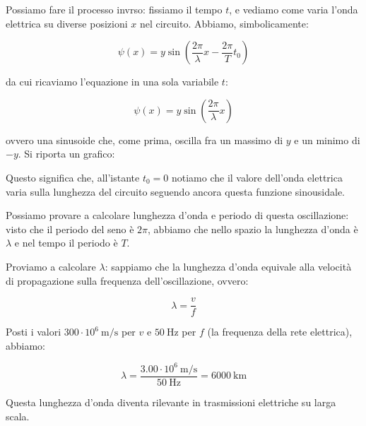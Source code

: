 \documentclass[a4paper,11pt]{article}
\begin{document}
Possiamo fare il processo invrso: fissiamo il tempo $t$, e vediamo come varia l'onda elettrica su diverse posizioni $x$ nel circuito.
Abbiamo, simbolicamente:

$$
	\psi(x) = y \sin{\left( \frac{2\pi}{\lambda}x - \frac{2\pi}{T} t_0 \right)}
$$

da cui ricaviamo l'equazione in una sola variabile $t$:

$$
	\psi(x) = y \sin{\left( \frac{2\pi}{\lambda}x \right)}
$$

ovvero una sinusoide che, come prima, oscilla fra un massimo di $y$ e un minimo di $-y$.
Si riporta un grafico:

\begin{center}


\end{center}

Questo significa che, all'istante $t_0 = 0$ notiamo che il valore dell'onda elettrica varia sulla lunghezza del circuito seguendo ancora questa funzione sinousidale.

Possiamo provare a calcolare lunghezza d'onda e periodo di questa oscillazione: visto che il periodo del seno è $2\pi$, abbiamo che nello spazio la lunghezza d'onda è $\lambda$ e nel tempo il periodo è $T$.

Proviamo a calcolare $\lambda$: sappiamo che la lunghezza d'onda equivale alla velocità di propagazione sulla frequenza dell'oscillazione, ovvero:

$$
\lambda = \frac{v}{f}
$$

Posti i valori $300 \cdot 10^6 \ \mathrm{m/s}$ per $v$ e $50 \ \text{Hz}$ per $f$ (la frequenza della rete elettrica), abbiamo:

$$
\lambda = \frac{3.00 \cdot 10^6 \ \mathrm{m/s}}{50 \ \text{Hz}} = 6000 \ \text{km} 
$$

Questa lunghezza d'onda diventa rilevante in trasmissioni elettriche su larga scala.
\end{document}
